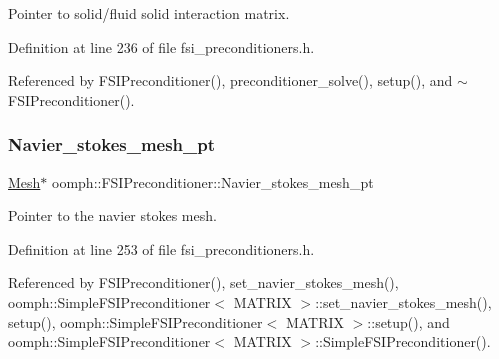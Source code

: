Pointer to solid/fluid solid interaction matrix. 



Definition at line 236 of file fsi\+\_\+preconditioners.\+h.



Referenced by F\+S\+I\+Preconditioner(), preconditioner\+\_\+solve(), setup(), and $\sim$\+F\+S\+I\+Preconditioner().

\mbox{\label{classoomph_1_1FSIPreconditioner_a201e3fcf3e13bd19b3871e9d3a734a1d}} 
\subsubsection{\texorpdfstring{Navier\+\_\+stokes\+\_\+mesh\+\_\+pt}{Navier\_stokes\_mesh\_pt}}
{\footnotesize\ttfamily \hyperlink{classoomph_1_1Mesh}{Mesh}$\ast$ oomph\+::\+F\+S\+I\+Preconditioner\+::\+Navier\+\_\+stokes\+\_\+mesh\+\_\+pt\hspace{0.3cm}{\ttfamily [private]}}



Pointer to the navier stokes mesh. 



Definition at line 253 of file fsi\+\_\+preconditioners.\+h.



Referenced by F\+S\+I\+Preconditioner(), set\+\_\+navier\+\_\+stokes\+\_\+mesh(), oomph\+::\+Simple\+F\+S\+I\+Preconditioner$<$ M\+A\+T\+R\+I\+X $>$\+::set\+\_\+navier\+\_\+stokes\+\_\+mesh(), setup(), oomph\+::\+Simple\+F\+S\+I\+Preconditioner$<$ M\+A\+T\+R\+I\+X $>$\+::setup(), and oomph\+::\+Simple\+F\+S\+I\+Preconditioner$<$ M\+A\+T\+R\+I\+X $>$\+::\+Simple\+F\+S\+I\+Preconditioner().

\mbox{\label{classoomph_1_1FSIPreconditioner_adc98903b78d0bc97c40eb733eaf6e498}} 

